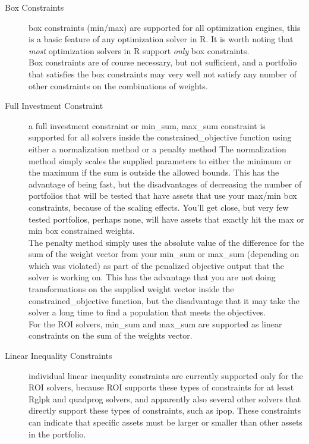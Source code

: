 \documentclass[12pt,letterpaper,english]{article}
\begin{document}
\begin{description}

\item[ Box Constraints ] box constraints (min/max) are supported for all optimization engines, this is a basic feature of any optimization solver in R.  It is worth noting that \emph{most} optimization solvers in R support \emph{only} box constraints.
\\ Box constraints are of course necessary, but not sufficient, and a portfolio that satisfies the box constraints may very well not satisfy any number of other constraints on the combinations of weights.

\item[ Full Investment Constraint ] a full investment constraint or min\_sum, max\_sum constraint is supported for all solvers inside the constrained\_objective function using either a normalization method or a penalty method
The normalization method simply scales the supplied parameters to either the minimum or the maximum if the sum is outside the allowed bounds.  This has the advantage of being fast, but the disadvantages of decreasing the number of portfolios that will be tested that have assets that use your max/min box constraints, because of the scaling effects.  You'll get close, but very few tested portfolios, perhaps none, will have assets that exactly hit the max or min box constrained weights.
\\ The penalty method simply uses the absolute value of the difference for the sum of the weight vector from your min\_sum or max\_sum (depending on which was violated) as part of the penalized objective output that the solver is working on.  This has the advantage that you are not doing transformations on the supplied weight vector inside the constrained\_objective function, but the disadvantage that it may take the solver a long time to find a population that meets the objectives.
\\ For the ROI solvers, min\_sum and max\_sum are supported as linear constraints on the sum of the weights vector.

\item[Linear Inequality Constraints] individual linear inequality constraints are currently supported only for the ROI solvers, because ROI supports these types of constraints for at least Rglpk and quadprog solvers, and apparently also several other solvers that directly support these types of constraints, such as ipop.  These constraints can indicate that specific assets must be larger or smaller than other assets in the portfolio. 


\end{description}
\end{document}
